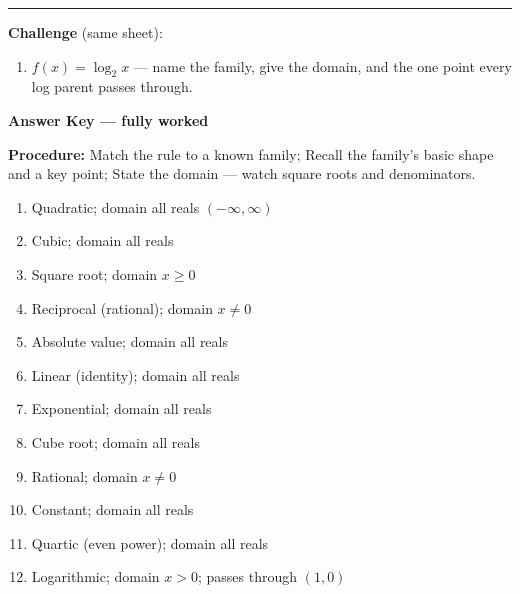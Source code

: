 \documentclass[12pt]{article}
\begin{document}
\vspace{0.2cm}\hrule\vspace{0.3cm}
\textbf{Challenge} (same sheet):\\[4pt]
\begin{enumerate}[label=\textbf{\arabic*.}, start=12, itemsep=2.2cm]
  \item $f(x)=\log_{2} x$ --- name the family, give the domain, and the one point every log parent passes through.
\end{enumerate}

\newpage

\begin{center}{\Large \textbf{Answer Key --- fully worked}}\end{center}
\vspace{0.25cm}
\textbf{Procedure:} Match the rule to a known family; Recall the family's basic shape and a key point; State the domain --- watch square roots and denominators.\\[8pt]
\begin{enumerate}[label=\textbf{\arabic*.},itemsep=7pt]
  \item Quadratic; domain all reals $(-\infty,\infty)$
  \item Cubic; domain all reals
  \item Square root; domain $x\ge 0$
  \item Reciprocal (rational); domain $x\ne 0$
  \item Absolute value; domain all reals
  \item Linear (identity); domain all reals
  \item Exponential; domain all reals
  \item Cube root; domain all reals
  \item Rational; domain $x\ne 0$
  \item Constant; domain all reals
  \item Quartic (even power); domain all reals
  \item Logarithmic; domain $x>0$; passes through $(1,0)$
\end{enumerate}
\end{document}
